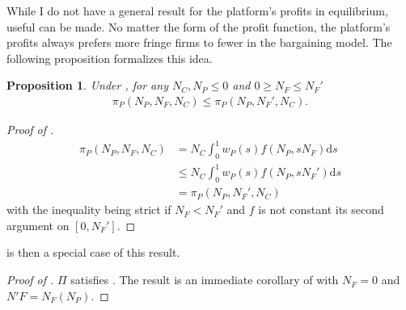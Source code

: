 \documentclass[a4paper]{article}
\newtheorem{proposition}{Proposition}
\newcommand{\ds}{\mathrm{d}s}
\begin{document}
While I do not have a general result for the platform's profits in equilibrium, useful can be made.
No matter the form of the profit function, the platform's profits always prefers more fringe firms to fewer in the bargaining model.
The following proposition formalizes this idea.
\begin{proposition}
    \label{prop:hybrid_vs_retail_general}
    Under , for any $N_C, N_P\leq 0$ and $0 \geq N_F \leq N_F'$
    \begin{align*}
        \pi_P(N_P, N_F, N_C) \leq \pi_P(N_P, N_F', N_C).
    \end{align*}
\end{proposition}
\begin{proof}[Proof of ]
    \begin{align*}
        \pi_P(N_P, N_F, N_C) &= N_C \int_0^1 w_P(s) f(N_P, s N_F) \ds \\
        &\leq  N_C \int_0^1 w_P(s) f(N_P, s N_F') \ds \\
        &= \pi_P(N_P, N_F', N_C)
    \end{align*}
    with the inequality being strict if $N_F < N_F'$ and $f$ is not constant its second argument on $[0, N_F']$.
\end{proof}

 is then a special case of this result.
\begin{proof}[Proof of ]
    $\Pi$ satisfies .
    The result is an immediate corollary of  with $N_F=0$ and $N'F=N_F(N_P)$.
\end{proof}
\end{document}
